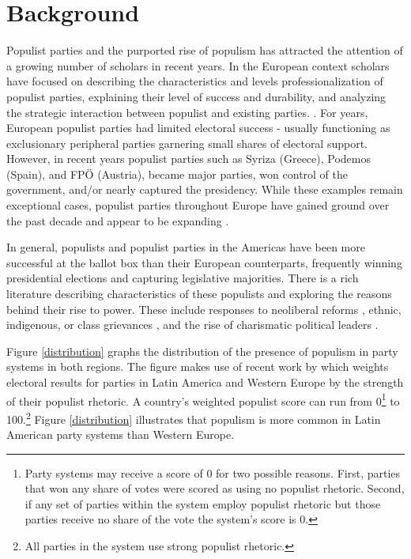 \documentclass[a4paper,12pt]{article}\usepackage[]{graphicx}\usepackage[]{color}
\begin{document}
\section*{Background}
Populist parties and the purported rise of populism has attracted the attention of a growing number of scholars in recent years. In the  European context scholars have focused on describing the characteristics and levels professionalization of populist parties, explaining their level of success and durability, and analyzing the strategic interaction between populist and existing parties. \citep{betz1994radical, mudde2007populist, bale2010if, art2011inside}. For years, European populist parties had limited electoral success - usually functioning as exclusionary peripheral parties garnering small shares of electoral support. However, in recent years populist parties such as Syriza (Greece),  Podemos (Spain), and FP\"{O} (Austria), became major parties, won control of the government, and/or nearly captured the presidency. While these examples remain exceptional cases, populist parties throughout Europe have gained ground over the past decade and appear to be expanding \citep{mudde2017populism}.
\par
In general, populists and populist parties in the Americas have been more successful at the ballot box than their European counterparts, frequently winning presidential elections and capturing legislative majorities. There is a rich literature describing characteristics of these populists and exploring the reasons behind their rise to power. These include responses to neoliberal reforms \citep{weyland1999neoliberal,roberts1995neoliberalism,roberts2013market}, ethnic, indigenous, or class grievances \citep{webber2011rebellion,madrid2008rise}, and the rise of charismatic political leaders \citep{hawkins2003populism}. 
\par
Figure \ref{distribution} graphs the distribution of the presence of populism in party systems in both regions. The figure makes use of recent work by \citet{hawkins2015mapping} which weights electoral results for parties in Latin America and Western Europe by the strength of their populist rhetoric. A country's weighted populist score can run from 0\footnote{Party systems may receive a score of 0 for two possible reasons. First, parties that won any share of votes were scored as using no populist rhetoric. Second, if any set of parties within the system employ populist rhetoric but those parties receive no share of the vote the system's score is 0.} to 100.\footnote{All parties in the system use strong populist rhetoric.}  Figure \ref{distribution} illustrates that populism is more common in Latin American party systems than Western Europe. 
\end{document}
